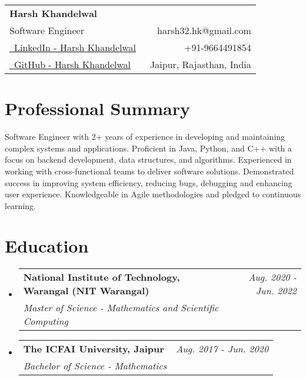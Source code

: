 \documentclass[a4paper,12pt]{article}
\makeatletter
\newcommand{\resumeSubheading}[4]{
\vspace{-1.0mm}\item[]
    \begin{tabular*}{0.98\textwidth}[t]{l@{\extracolsep{\fill}}r}
        \textbf{#1} & \textit{\footnotesize{#4}} \\
        \textit{\footnotesize{#3}} &  \footnotesize{#2}\\
    \end{tabular*}
    \vspace{-1.0mm}
}
\newcommand{\resumeSubHeadingListStart}{\begin{itemize}[leftmargin=*,labelsep=0mm]}
\newcommand{\resumeSubHeadingListEnd}{\end{itemize}\vspace{2mm}}
\newcommand{\name}{Harsh Khandelwal} %
\newcommand{\phone}{9664491854} %
\newcommand{\emaila}{harsh32.hk@gmail.com} %
\makeatother
\begin{document}

\parbox{\dimexpr\linewidth-0.5cm\relax}{
\begin{tabularx}{\linewidth}{L r} \\
  \textbf{\Large \name}\\
  {Software Engineer} & \raisebox{0.0\height}{\footnotesize \faEnvelope}\ {\emaila} \\
  \href{https://www.linkedin.com/in/harsh-khandelwal-094866201/}{\raisebox{0.0\height}{\footnotesize \faLinkedin}\ LinkedIn - Harsh Khandelwal} &  {\raisebox{0.0\height}{\footnotesize \faPhone}\ +91-\phone} \\
  \href{https://github.com/redhlk}{\raisebox{0.0\height}{\footnotesize \faGithub}\ {GitHub - \name}}
  & {\raisebox{0.0\height}{\footnotesize}\ Jaipur, Rajasthan, India}\\
\end{tabularx}
}

\section{\textbf{Professional Summary}}
\begin{justify}
 Software Engineer with 2+ years of experience in developing and maintaining complex systems and applications. Proficient in Java, Python, and C++ with a focus on backend development, data structures, and algorithms. Experienced in working with cross-functional teams to deliver software solutions. Demonstrated success in improving system efficiency, reducing bugs, debugging and enhancing user experience. Knowledgeable in Agile methodologies and pledged to continuous learning.\end{justify}
\section{\textbf{Education}}
  \resumeSubHeadingListStart
    \resumeSubheading
      {National Institute of Technology, Warangal (NIT Warangal)}{}
      {Master of Science - Mathematics and Scientific Computing}{Aug. 2020 -  Jun. 2022}
    \resumeSubheading
      {The ICFAI University, Jaipur}{}
      {Bachelor of Science - Mathematics}{Aug. 2017 - Jun. 2020}
  \resumeSubHeadingListEnd
\vspace{-13pt}

\end{document}
